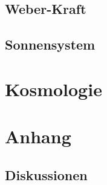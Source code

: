 \documentclass{book}
\numberwithin{equation}{section}
\begin{document}
\chapter{Weber-Kraft}





\chapter{Sonnensystem}



\part{Kosmologie}

\part{Anhang}
\chapter{Diskussionen}

\end{document}
